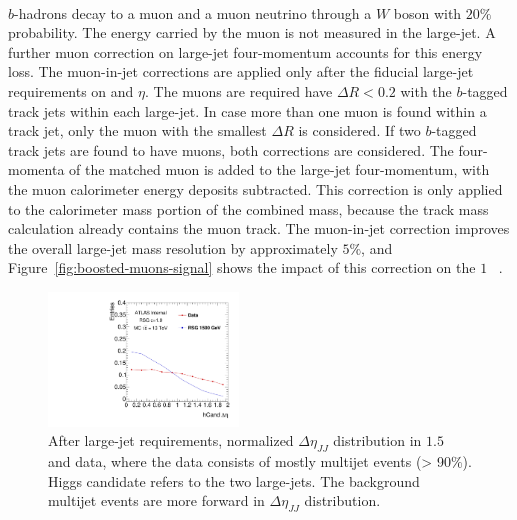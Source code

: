 \paragraph{}
$b$-hadrons decay to a muon and a muon neutrino through a $W$ boson with $20\%$ probability.
The energy carried by the muon is not measured in the large-\R jet.
A further muon correction on large-\R jet four-momentum accounts for this energy loss.
The muon-in-jet corrections are applied only after the fiducial large-\R jet requirements on \pt and $\eta$.
The muons are required have $\Delta R < 0.2$ with the $b$-tagged track jets within each large-\R jet. 
In case more than one muon is found within a track jet, only the muon with the smallest $\Delta R$ is considered. 
If two $b$-tagged track jets are found to have muons, both corrections are considered. 
The four-momenta of the matched muon is added to the large-\R jet four-momentum, with the muon calorimeter energy deposits subtracted. 
This correction is only applied to the calorimeter mass portion of the combined mass, because the track mass calculation already contains the muon track. 
The muon-in-jet correction improves the overall large-\R jet mass resolution by approximately $5\%$, and Figure~\ref{fig:boosted-muons-signal} shows the impact of this correction on the $1$\TeV~ \Grav.

\begin{figure}
\begin{center}
  \includegraphics[width=0.45\textwidth,angle=-90]{figures/boosted/Other/AllTag_Signal_hCandDeta_F_c10-cb-no-deta-cut_truth_0.pdf}
  \caption{ After large-\R jet requirements, normalized $\Delta \eta_{JJ}$ distribution in $1.5$ \TeV \Grav~ and data, where the data consists of mostly multijet events (> 90$\%$). Higgs candidate refers to the two large-\R jets. The background multijet events are more forward in $\Delta \eta_{JJ}$ distribution.}
\label{fig:app-check-deta}
\end{center}
\end{figure}

